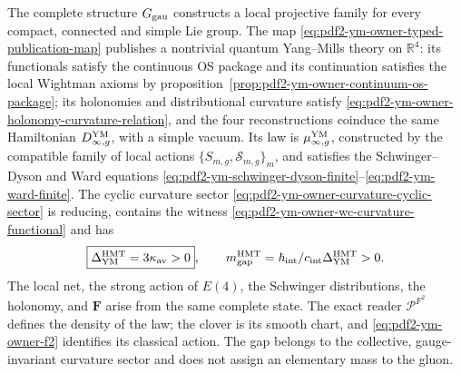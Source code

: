 \begin{theorem}
\label{thm:pdf2-ym-cierre-global}
The complete structure $\mathfrak G_{\rm gau}$ constructs a local projective
family for every compact, connected and simple Lie group. The map
\eqref{eq:pdf2-ym-owner-typed-publication-map} publishes a nontrivial quantum
Yang--Mills theory on $\mathbb R^4$: its functionals satisfy the continuous OS
package and its continuation satisfies the local Wightman axioms by
proposition~\ref{prop:pdf2-ym-owner-continuum-os-package}; its
holonomies and distributional
curvature satisfy
\eqref{eq:pdf2-ym-owner-holonomy-curvature-relation}, and the four reconstructions
coinduce the same Hamiltonian $D_{\infty,g}^{\rm YM}$, with a simple vacuum. Its law is
$\widehat\mu_{\infty,g}^{\rm YM}$, constructed by the compatible family of local
actions $\{S_{m,g},\mathscr S_{m,g}\}_m$, and
satisfies the Schwinger--Dyson and Ward equations
\eqref{eq:pdf2-ym-schwinger-dyson-finite}--\eqref{eq:pdf2-ym-ward-finite}. The cyclic curvature
sector
\eqref{eq:pdf2-ym-owner-curvature-cyclic-sector} is reducing, contains the witness
\eqref{eq:pdf2-ym-owner-wc-curvature-functional} and has
\begin{equation}\label{eq:pdf2-ym-final-gap}
 \boxed{\Delta_{\rm YM}^{\rm HMT}=3\kappa_{\rm av}>0},
 \qquad
 m_{\rm gap}^{\rm HMT}
 =\frac{\hbar_{\rm int}}{c_{\rm int}}\Delta_{\rm YM}^{\rm HMT}>0.
\end{equation}
The local net, the strong action of $E(4)$, the Schwinger distributions, the
holonomy, and $\mathbf F$ arise from the same complete state. The exact reader
$\mathcal P^{F^2}$ defines the density of the law; the clover is its smooth chart, and
\eqref{eq:pdf2-ym-owner-f2} identifies its classical action. The gap belongs to the collective,
gauge-invariant curvature sector and does not assign an elementary mass to the gluon.
\end{theorem}

